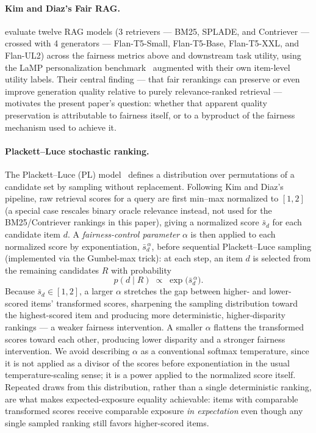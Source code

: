\documentclass[11pt]{article}
\begin{document}
\paragraph{Kim and Diaz's Fair RAG.} \citet{kim2025fairrag} evaluate twelve
RAG models (3 retrievers --- BM25, SPLADE, and Contriever --- crossed with
4 generators --- Flan-T5-Small, Flan-T5-Base, Flan-T5-XXL, and Flan-UL2)
across the fairness metrics above and downstream task utility, using the
LaMP personalization benchmark~\citep{salemi2024lamp} augmented with their
own item-level utility labels. Their central finding --- that fair
rerankings can
preserve or even improve generation quality relative to purely
relevance-ranked retrieval --- motivates the present paper's question:
whether that apparent quality preservation is attributable to fairness
itself, or to a byproduct of the fairness mechanism used to achieve it.

\paragraph{Plackett--Luce stochastic ranking.} The Plackett--Luce (PL)
model~\citep{plackett1975analysis,luce1959individual} defines a
distribution over permutations of a candidate set by sampling without
replacement. Following Kim and Diaz's pipeline, raw retrieval scores for a
query are first min--max normalized to $[1,2]$ (a special case rescales
binary oracle relevance instead, not used for the BM25/Contriever
rankings in this paper), giving a normalized score $\bar s_d$ for each
candidate item $d$. A \emph{fairness-control parameter} $\alpha$ is then
applied to each normalized score by exponentiation, $\bar s_d^{\,\alpha}$,
before sequential Plackett--Luce sampling (implemented via the Gumbel-max
trick): at each step, an item $d$ is selected from the remaining
candidates $R$ with probability
\[
p(d \mid R) \;\propto\; \exp\!\big(\bar s_d^{\,\alpha}\big).
\]
Because $\bar s_d\in[1,2]$, a larger $\alpha$ stretches the gap between
higher- and lower-scored items' transformed scores, sharpening the
sampling distribution toward the highest-scored item and producing more
deterministic, higher-disparity rankings --- a weaker fairness
intervention. A smaller $\alpha$ flattens the transformed scores toward
each other, producing lower disparity and a stronger fairness
intervention. We avoid describing $\alpha$ as a conventional softmax
temperature, since it is not applied as a divisor of the scores before
exponentiation in the usual temperature-scaling sense; it is a power
applied to the normalized score itself. Repeated draws from this
distribution, rather than a single deterministic ranking, are what makes
expected-exposure equality achievable: items with comparable transformed
scores receive comparable exposure \emph{in expectation} even though any
single sampled ranking still favors higher-scored items.
\end{document}
